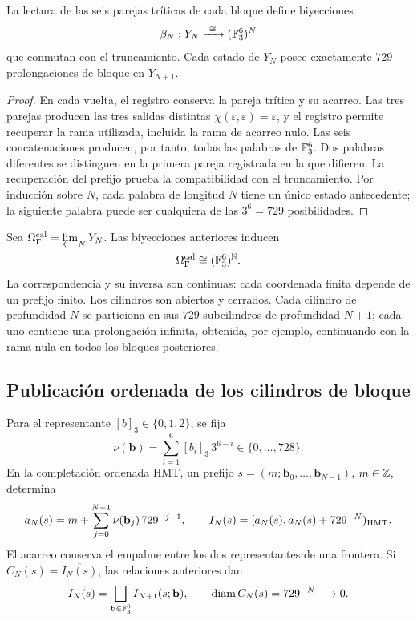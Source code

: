 \begin{proposition}
\label{hmtfg:bloques-729}
La lectura de las seis parejas tríticas de cada bloque define biyecciones
\[
 \beta_N:Y_N\xrightarrow{\ \cong\ }(\FF_3^6)^N
\]
que conmutan con el truncamiento. Cada estado de \(Y_N\) posee
exactamente \(729\) prolongaciones de bloque en \(Y_{N+1}\).
\end{proposition}
\begin{proof}
En cada vuelta, el registro conserva la pareja trítica y su acarreo.
Las tres parejas producen las tres salidas distintas
\(\chi(\varepsilon,\varepsilon)=\varepsilon\), y el registro permite
recuperar la rama utilizada, incluida la rama de acarreo nulo.
Las seis concatenaciones producen, por tanto, todas las palabras de
\(\mathbb F_3^6\). Dos palabras diferentes se distinguen en la primera pareja
registrada en la que difieren. La recuperación del prefijo prueba la
compatibilidad con el truncamiento. Por inducción sobre \(N\), cada
palabra de longitud \(N\) tiene un único estado antecedente; la siguiente
palabra puede ser cualquiera de las \(3^6=729\) posibilidades.
\end{proof}

Sea \(\Omega_{\Gamma}^{\rm cal}=\varprojlim_NY_N\). Las biyecciones
anteriores inducen
\[
 \Omega_{\Gamma}^{\rm cal}\cong(\mathbb F_3^6)^{\mathbb N}.
\]
La correspondencia y su inversa son continuas: cada coordenada finita
depende de un prefijo finito. Los cilindros son abiertos y cerrados.
Cada cilindro de profundidad \(N\) se particiona en sus \(729\)
subcilindros de profundidad \(N+1\); cada uno contiene una prolongación
infinita, obtenida, por ejemplo, continuando con la rama nula en todos
los bloques posteriores.



\subsection{Publicación ordenada de los cilindros de bloque}
\label{hmtfg:publicacion-cilindros-bloque}

Para el representante \([b]_3\in\{0,1,2\}\), se fija
\[
 \nu(\mathbf b)=\sum_{i=1}^6[b_i]_3\,3^{6-i}\in\{0,\ldots,728\}.
\]
En la completación ordenada HMT, un prefijo
\(s=(m;\mathbf b_0,\ldots,\mathbf b_{N-1})\), \(m\in\mathbb Z\), determina
\[
 a_N(s)=m+\sum_{j=0}^{N-1}\nu(\mathbf b_j)\,729^{-j-1},\qquad
 I_N(s)=[a_N(s),a_N(s)+729^{-N})_{\rm HMT}.
\]
El acarreo conserva el empalme entre los dos representantes de una
frontera. Si \(C_N(s)=\overline{I_N(s)}\), las relaciones anteriores dan
\[
 I_N(s)=\bigsqcup_{\mathbf b\in\mathbb F_3^6}I_{N+1}(s;\mathbf b),
 \qquad \operatorname{diam}C_N(s)=729^{-N}\longrightarrow0.
\]

